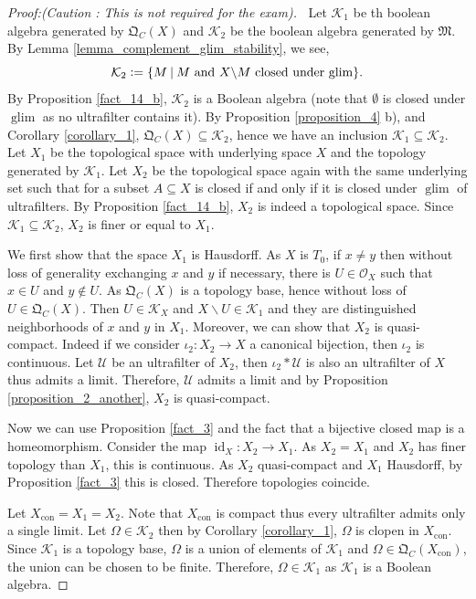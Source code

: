\documentclass[10pt]{article}
\numberwithin{equation}{section}
\theoremstyle{definition}
\DeclareMathOperator{\id}{id}
\DeclareMathOperator{\glim}{glim}
\DeclareMathOperator{\con}{con}
\newcommand{\defeq}{\vcentcolon=}
\newcommand{\Ouv}{\mathscr{O}}
\newcommand{\U}[0]{\mathcal{U}}
\newcommand{\cK}[0]{\mathcal{K}}
\newcommand{\sep}[0]{\:|\:}
\newcommand{\QC}[0]{\mathfrak{Q}_C}
\begin{document}
\begin{proof}[Proof:(Caution : This is not required for the exam)]$\:$
Let $\mathcal{K}_1$ be th boolean algebra generated by $\QC(X)$ and $\mathcal{K}_2$ be the boolean algebra generated by $\mathfrak{M}$. By Lemma \ref{lemma_complement_glim_stability}, we see,
\begin{equation*}
    \mathcal{K}_2 \defeq \{M\sep \text{$M$ and $X\backslash M$ closed under $\glim$}\}.
\end{equation*}
By Proposition \ref{fact_14_b}, $\mathcal{K}_2$ is a Boolean algebra (note that $\emptyset$ is closed under $\glim$ as no ultrafilter contains it). By Proposition \ref{proposition_4} b), and Corollary \ref{corollary_1}, $\QC(X)\subseteq\mathcal{K}_2$, hence we have an inclusion $\mathcal{K}_1\subseteq\mathcal{K}_2$.
Let $X_1$ be the topological space with underlying space $X$ and the topology generated by $\cK_1$. Let $X_2$ be the topological space again with the same underlying set such that for a subset $A\subseteq X$ is closed if and only if it is closed under $\glim$ of ultrafilters.
By Proposition \ref{fact_14_b}, $X_2$ is indeed a topological space. Since $\cK_1\subseteq \cK_2$, $X_2$ is finer or equal to $X_1$.
\par We first show that the space $X_1$ is Hausdorff. As $X$ is $T_0$, if $x\not=y$ then without loss of generality exchanging $x$ and $y$ if necessary, there is $U\in\Ouv_X$ such that $x\in U$ and $y\not\in U$. As $\QC(X)$ is a topology base, hence without loss of $U\in\QC(X)$. Then $U\in\cK_X$ and $X\backslash U\in\cK_1$ and they are distinguished neighborhoods of $x$ and $y$ in $X_1$.
Moreover, we can show that $X_2$ is quasi-compact. Indeed if we consider $\iota_2:X_2\to X$ a canonical bijection, then $\iota_2$ is continuous. Let $\U$ be an ultrafilter of $X_2$, then $\iota_2*\U$ is also an ultrafilter of $X$ thus admits a limit. Therefore, $\U$ admits a limit and by Proposition \ref{proposition_2_another}, $X_2$ is quasi-compact.
\par Now we can use Proposition \ref{fact_3} and the fact that a bijective closed map is a homeomorphism. Consider the map $\id_X:X_2\to X_1$. As $X_2=X_1$ and $X_2$ has finer topology than $X_1$, this is continuous. As $X_2$ quasi-compact and $X_1$ Hausdorff, by Proposition \ref{fact_3} this is closed. Therefore topologies coincide.
\par Let $X_{\con}=X_1=X_2$. Note that $X_{\con}$ is compact thus every ultrafilter admits only a single limit. Let $\Omega\in\cK_2$ then by Corollary \ref{corollary_1}, $\Omega$ is clopen in $X_{\con}$. Since $\cK_1$ is a topology base, $\Omega$ is a union of elements of $\cK_1$ and $\Omega\in\QC(X_{\con})$, the union can be chosen to be finite. Therefore, $\Omega\in\cK_1$ as $\cK_1$ is a Boolean algebra.

\end{proof}
\end{document}
